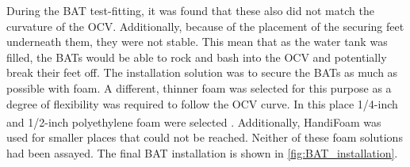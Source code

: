 \par
During the BAT test-fitting, it was found that these also did not match the curvature of the OCV.
Additionally, because of the placement of the securing feet underneath them, they were not stable.
This mean that as the water tank was filled, the BATs would be able to rock and bash into the OCV and potentially break their feet off.
The installation solution was to secure the BATs as much as possible with foam.
A different, thinner foam was selected for this purpose as a degree of flexibility was required to follow the OCV curve.
In this place 1/4-inch and 1/2-inch polyethylene foam were selected \cite{white_foam_ref}.
Additionally, HandiFoam\textsuperscript{\textregistered} was used for smaller places that could not be reached.
Neither of these foam solutions had been assayed.
The final BAT installation is shown in \autoref{fig:BAT_installation}.

